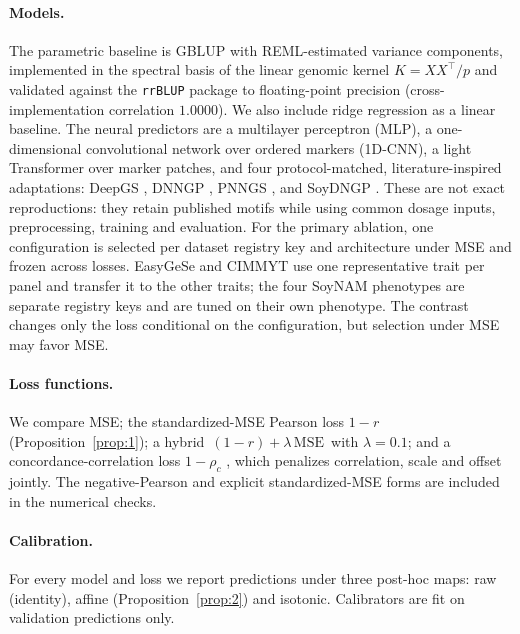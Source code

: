 \documentclass[11pt]{article}
\theoremstyle{plain}
\theoremstyle{remark}
\begin{document}
\paragraph{Models.} The parametric baseline is GBLUP with REML-estimated variance
components, implemented in the spectral basis of the linear genomic kernel
$K=XX^\top/p$ and validated against the \texttt{rrBLUP} package
\citep{endelman2011} to floating-point precision (cross-implementation
correlation $1.0000$). We also include ridge regression as a linear baseline. The neural predictors
are a multilayer perceptron (MLP), a one-dimensional convolutional network over
ordered markers (1D-CNN), a light Transformer over marker patches, and four
protocol-matched, literature-inspired adaptations: DeepGS
\citep{ma2018deepgs}, DNNGP \citep{wang2023dnngp}, PNNGS \citep{pnngs2024}, and
SoyDNGP \citep{gao2023soydngp}. These are not exact reproductions: they retain
published motifs while using common dosage inputs, preprocessing, training and
evaluation. For the primary ablation, one configuration is selected per dataset
registry key and architecture under MSE and frozen across losses. EasyGeSe and
CIMMYT use one representative trait per panel and transfer it to the other
traits; the four SoyNAM phenotypes are separate registry keys and are tuned on
their own phenotype. The contrast changes only the loss conditional on the
configuration, but selection under MSE may favor MSE.

\paragraph{Loss functions.} We compare MSE; the standardized-MSE Pearson loss
$1-r$ (Proposition~\ref{prop:1}); a hybrid $\,(1-r)+\lambda\,\mathrm{MSE}\,$ with
$\lambda=0.1$; and a concordance-correlation loss $1-\rho_c$ \citep{lin1989},
which penalizes correlation, scale and offset jointly. The negative-Pearson and
explicit standardized-MSE forms are included in the numerical checks.

\paragraph{Calibration.} For every model and loss we report predictions under
three post-hoc maps: raw (identity), affine (Proposition~\ref{prop:2}) and
isotonic. Calibrators are fit on validation predictions only.
\end{document}
